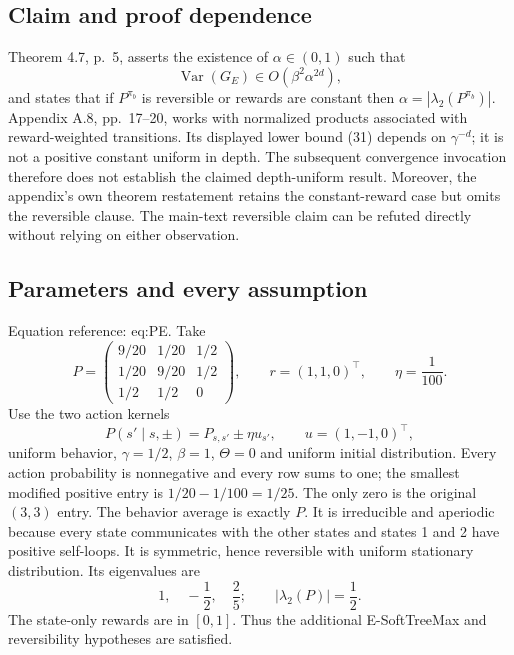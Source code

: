 \documentclass[10pt]{article}
\begin{document}
\subsection*{Claim and proof dependence}
Theorem 4.7, p. 5, asserts the existence of \(\alpha\in(0,1)\) such that \[\operatorname{Var}(G_E)\in O(\beta^2\alpha^{2d}),\] and states that if \(P^{\pi_b}\) is reversible or rewards are constant then \(\alpha=|\lambda_2(P^{\pi_b})|\). Appendix A.8, pp. 17–20, works with normalized products associated with reward-weighted transitions. Its displayed lower bound (31) depends on \(\gamma^{-d}\); it is not a positive constant uniform in depth. The subsequent convergence invocation therefore does not establish the claimed depth-uniform result. Moreover, the appendix’s own theorem restatement retains the constant-reward case but omits the reversible clause. The main-text reversible claim can be refuted directly without relying on either observation.\par
\subsection*{Parameters and every assumption}
Equation reference: eq:PE. Take \[
 P=\begin{pmatrix}
  9/20&1/20&1/2\\
  1/20&9/20&1/2\\
  1/2&1/2&0
 \end{pmatrix},\qquad
 r=(1,1,0)^\top,\qquad \eta=\frac1{100}.\] Use the two action kernels \[P(s'\mid s,\pm)=P_{s,s'}\pm\eta u_{s'},\qquad
 u=(1,-1,0)^\top,\] uniform behavior, \(\gamma=1/2\), \(\beta=1\), \(\Theta=0\) and uniform initial distribution. Every action probability is nonnegative and every row sums to one; the smallest modified positive entry is \(1/20-1/100=1/25\). The only zero is the original \((3,3)\) entry. The behavior average is exactly \(P\). It is irreducible and aperiodic because every state communicates with the other states and states 1 and 2 have positive self-loops. It is symmetric, hence reversible with uniform stationary distribution. Its eigenvalues are \[1,\quad -\frac12,\quad \frac25;
 \qquad |\lambda_2(P)|=\frac12.\] The state-only rewards are in \([0,1]\). Thus the additional E-SoftTreeMax and reversibility hypotheses are satisfied.\par
\end{document}
